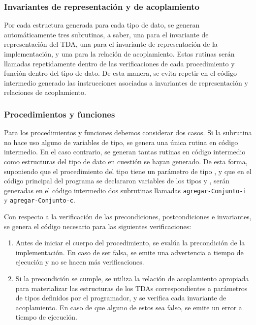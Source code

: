 {{\subsubsection{Invariantes de representación y de acoplamiento}

Por cada estructura generada para cada tipo de dato, se generan automáticamente
tres subrutinas, a saber, una para el invariante de representación del TDA,  una
para el invariante de representación de la implementación, y una para la
relación de acoplamiento. Estas rutinas serán llamadas repetidamente dentro de
las verificaciones de cada procedimiento y función dentro del tipo de dato. De
esta manera, se evita repetir en el código intermedio generado las instrucciones
asociadas a invariantes de representación y relaciones de acoplamiento.

\subsubsection{Procedimientos y funciones}

Para los procedimientos y funciones debemos considerar dos casos. Si la
subrutina no hace uso alguno de variables de tipo, se genera una única rutina en
código intermedio. En el caso contrario, se generan tantas rutinas en código
intermedio como estructuras del tipo de dato en cuestión se hayan generado. De
esta forma, suponiendo que el procedimiento  del tipo
 tiene un parámetro de tipo , y que en
el código principal del programa se declararon variables de los tipos
 y , serán generadas en el código
intermedio dos subrutinas llamadas \texttt{agregar-Conjunto-i} y
\texttt{agregar-Conjunto-c}.

Con respecto a la verificación de las precondiciones, postcondiciones e
invariantes, se genera el código necesario para las siguientes verificaciones:

\begin{enumerate}

  \item Antes de iniciar el cuerpo del procedimiento, se evalúa la precondición
  de la implementación. En caso de ser falsa, se emite una advertencia a tiempo
  de ejecución y no se hacen más verificaciones.

  \item Si la precondición se cumple, se utiliza la relación de acoplamiento
  apropiada para materializar las estructuras de los TDAs correspondientes a
  parámetros de tipos definidos por el programador, y se verifica cada invariante
  de acoplamiento. En caso de que alguno de estos sea falso, se emite un error a
  tiempo de ejecución.


\end{enumerate}}}
